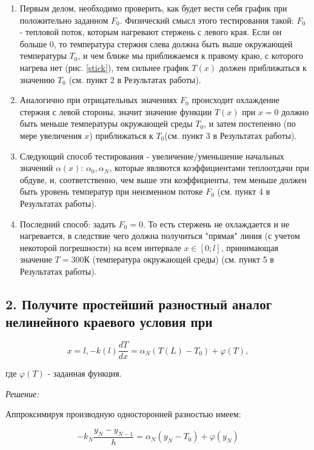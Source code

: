 \documentclass[a4paper,12pt]{article}
\begin{document}
	\begin{enumerate}
		\item Первым делом, необходимо проверить, как будет вести себя график при положительно заданном $F_0$. Физический смысл этого тестирования такой: $F_0$ - тепловой поток, которым нагревают стержень с левого края. Если он больше 0, то температура стержня слева должна быть выше окружающей температуры $T_0$, и чем ближе мы приближаемся к правому краю, с которого нагрева нет (рис. \ref{stick}), тем сильнее график $T(x)$ должен приближаться к значению $T_0$ (см. пункт 2 в Результатах работы).
		\item Аналогично при отрицательных значениях $F_0$ происходит охлаждение стержня с левой стороны, значит значение функции $T(x)$ при $x = 0$ должно быть меньше температуры окружающей среды $T_0$, и затем постепенно (по мере увеличения $x$) приближаться к $T_0$(см. пункт 3 в Результатах работы).
		\item Следующий способ тестирования - увеличение/уменьшение начальных значений $\alpha(x)$: $\alpha_0, \alpha_N$, которые являются коэффициентами теплоотдачи при обдуве, и, соответственно, чем выше эти коэффициенты, тем меньше должен быть уровень температур при неизменном потоке $F_0$ (см. пункт 4 в Результатах работы).
		\item Последний способ: задать $F_0 = 0$. То есть стержень не охлаждается и не нагревается, в следствие чего должна получиться "прямая" линия (с учетом некоторой погрешности) на всем интервале $x\in[0;l]$, принимающая значение $T = 300$К (температура окружающей среды) (см. пункт 5 в Результатах работы).
	\end{enumerate}
	
	\subsection*{2. Получите простейший разностный аналог нелинейного краевого условия при}
	
	\begin{equation}\label{f2}
	x = l, -k(l)\frac{dT}{dx}=\alpha_N(T(L)-T_0)+\varphi(T),
	\end{equation}
	
	где $\varphi(T)$ - заданная функция.
	
	\textit{Решение:}
	
	Аппроксимируя производную  односторонней разностью имеем:
	
	\begin{equation}\label{f5}
	-k_N\frac{y_N - y_{N-1}}{h} = \alpha_N(y_N-T_0) + \varphi(y_N)
	\end{equation}
	
\end{document}
